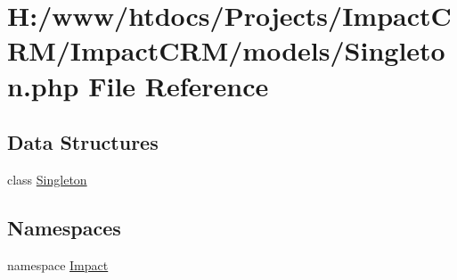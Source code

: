 \hypertarget{Singleton_8php}{
\section{H:/www/htdocs/Projects/ImpactCRM/ImpactCRM/models/Singleton.php File Reference}
\label{Singleton_8php}
}
\subsection*{Data Structures}
\begin{DoxyCompactItemize}
\item 
class \hyperlink{classSingleton}{Singleton}
\end{DoxyCompactItemize}
\subsection*{Namespaces}
\begin{DoxyCompactItemize}
\item 
namespace \hyperlink{namespaceImpact}{Impact}
\end{DoxyCompactItemize}
